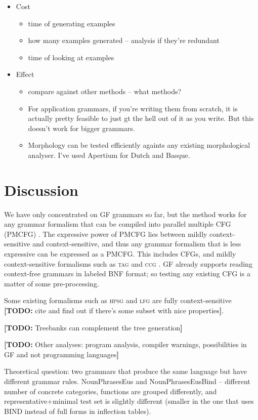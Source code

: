 \documentclass[11pt]{article}
\def\lfg{\textsc{lfg}}
\def\ccg{\textsc{ccg}}
\def\tag{\textsc{tag}}
\def\hpsg{\textsc{hpsg}}
\newcommand{\todo}[1]{{\color{cyan}\textbf{[TODO: }#1\textbf{]}}}
\begin{document}
\begin{itemize}
\item Cost
  \begin{itemize}
  \item time of generating examples
  \item how many examples generated -- analysis if they're redundant
  \item time of looking at examples
  \end{itemize}

\item Effect
  \begin{itemize}
  \item compare against other methods -- what methods?
  \item For application grammars, if you're writing them from scratch, it is actually pretty feasible to just gt the hell out of it as you write. But this doesn't work for bigger grammars.
  \item Morphology can be tested efficiently againts any existing morphological analyser. I've used Apertium for Dutch and Basque.
  \end{itemize}
\end{itemize}


\section{Discussion}

We have only concentrated on GF grammars so far, but the method works
for any grammar formalism that can be compiled into parallel
multiple CFG (PMCFG) \cite{seki91pmcfg}. The expressive power of PMCFG lies
between mildly context-sensitive and context-sensitive, and thus any
grammar formalism that is less expressive can be expressed as a
PMCFG. This includes CFGs, and mildly context-sensitive formalisms
such as \tag{} \cite{joshi1975tag} and \ccg{} \cite{steedman1988ccg}. GF
already supports reading context-free grammars in labeled BNF format;
so testing any existing CFG is a matter of some pre-processing.

Some existing formalisms such as \hpsg{} and \lfg{} are fully
context-sensitive \todo{cite and find out if there's some subset with
  nice properties}.

\todo{Treebanks can complement the tree generation}

\todo{Other analyses: program analysis, compiler warnings,
  possibilities in GF and not programming languages}

Theoretical question: two grammars that produce the same language but
have different grammar rules.
NounPhrasesEus and NounPhrasesEusBind -- different number of concrete
categories, functions are grouped differently, and
representative+minimal test set is slightly different (smaller in the
one that uses BIND instead of full forms in inflection tables).
\end{document}
